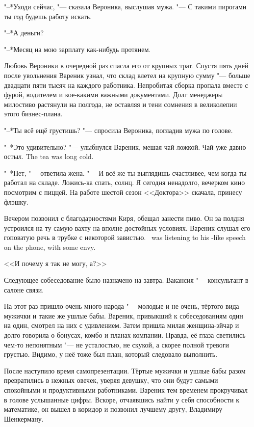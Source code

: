 "--*Уходи сейчас, "--- сказала Вероника, выслушав мужа.
"--- С такими пирогами ты год будешь работу искать.

"--*А деньги?

"--*Месяц на мою зарплату как-нибудь протянем.

Любовь Вероники в очередной раз спасла его от крупных трат.
Спустя пять дней после увольнения Вареник узнал, что склад влетел на крупную сумму "--- больше двадцати пяти тысяч на каждого работника.
Непробитая сборка пропала вместе с фурой, водителем и кое-какими важными документами.
Долг менеджеры милостиво растянули на полгода, не оставляя и тени сомнения в великолепии этого бизнес-плана.

"--*Ты всё ещё грустишь? "--- спросила Вероника, погладив мужа по голове.

"--*Это удивительно? "--- улыбнулся Вареник, мешая чай ложкой.
{Чай уже давно остыл.}
{The tea was long cold.}

"--*Нет, "--- ответила жена.
"--- И всё же ты выглядишь счастливее, чем когда ты работал на складе.
Ложись-ка спать, солнц.
Я сегодня ненадолго, вечерком кино посмотрим с пиццей.
На работе шестой сезон <<Доктора>> скачала, принесу флэшку.

Вечером позвонил с благодарностями Киря, обещал занести пиво.
Он за полдня устроился на ту самую вахту на вполне достойных условиях.
{Вареник слушал его гоповатую речь в трубке с некоторой завистью.}
{\Varenik\ was listening to his \gopnik-like speech on the phone, with some envy.}

<<И почему я так не могу, а?>>

\asterism

\label{Tue_2012_04_10}

Следующее собеседование было назначено на завтра.
Вакансия "--- консультант в салоне связи.

На этот раз пришло очень много народа "--- молодые и не очень, тёртого вида мужички и такие же ушлые бабы.
Вареник, привыкший к собеседованиям один на один, смотрел на них с удивлением.
Затем пришла милая женщина-эйчар и долго говорила о бонусах, комбо и планах компании.
Правда, её глаза светились чем-то непонятным "--- не усталостью, не скукой, а скорее полной тревоги грустью.
Видимо, у неё тоже был план, который следовало выполнить.

После наступило время самопрезентации.
Тёртые мужички и ушлые бабы разом превратились в нежных овечек, уверяя девушку, что они будут самыми спокойными и продуктивными работниками.
Вареник тем временем прокручивал в голове услышанные цифры.
Вскоре, отчаявшись найти у себя способности к математике, он вышел в коридор и позвонил лучшему другу, Владимиру Шенкерману.

